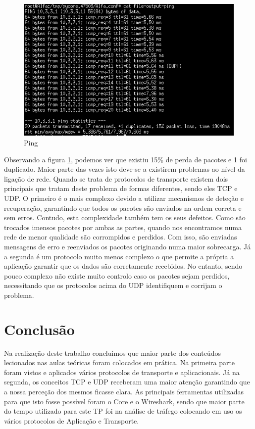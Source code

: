 \documentclass[a4paper]{report}
\begin{document}
\begin{figure}[H]
    \centering 
    \includegraphics[width=\textwidth]{images/4.png}  
    \caption{Ping}
    \label{fig:4}
\end{figure}

Observando a figura \ref{fig:4}, podemos ver que existiu 15\% de perda de pacotes e 1 foi duplicado. Maior parte das vezes isto
deve-se a existirem problemas ao nível da ligação de rede. Quando se trata de protocolos de transporte existem dois principais
que tratam deste problema de formas diferentes, sendo eles TCP e UDP. O primeiro é o mais complexo devido a utilizar mecanismos
de deteção e recuperação, garantindo que todos os pacotes são enviados na ordem correta e sem erros. Contudo, esta complexidade
também tem os seus defeitos. Como são trocados imensos pacotes por ambas as partes, quando nos encontramos numa rede de menor 
qualidade são corrompidos e perdidos. Com isso, são enviadas mensagens de erro e reenviados os pacotes originando numa maior
sobrecarga. Já a segunda é um protocolo muito menos complexo o que permite a própria a aplicação garantir que os dados são 
corretamente recebidos. No entanto, sendo pouco complexo não existe muito controlo caso os pacotes sejam perdidos, necessitando
que os protocolos acima do UDP identifiquem e corrijam o problema.

\chapter{Conclusão}

Na realização deste trabalho concluimos que maior parte dos conteúdos lecionados nas aulas teóricas foram colocados em prática.
Na primeira parte foram vistos e aplicados vários protocolos de transporte e aplicacionais.
Já na segunda, os conceitos TCP e UDP receberam uma maior atenção garantindo que a nossa perceção dos mesmos ficasse clara.
As principais ferramentas utilizadas para que isto fosse possível foram o Core e o Wireshark, sendo que maior parte do tempo
utilizado para este TP foi na análise de tráfego colocando em uso os vários protocolos de Aplicação e Transporte.
\end{document}
